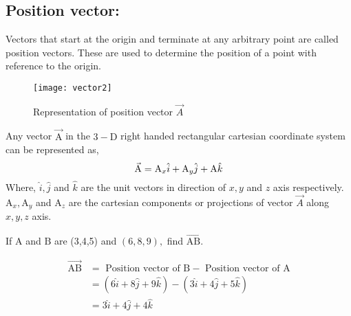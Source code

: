 \subsection{Position vector:} 
\begin{definition}
	Vectors that start at the origin and terminate at any arbitrary point are called position vectors. These are used to determine the position of a point with reference to the origin.
\end{definition}
\begin{figure}[H]
	\centering
	\texttt{[image: vector2]}
	\caption{Representation of position vector $\vec{A }$}
\end{figure}
 Any vector $\vec{\mathrm A}$ in the $3-\mathrm{\mathrm D}$ right handed rectangular cartesian coordinate system can be represented as,
 \begin{equation}
$$\vec{\mathrm A}=\mathrm A_{x} \hat{i}+\mathrm A_{y} \hat{j}+\mathrm A \hat{k}$$
 \end{equation} 
Where, $\hat{i}, \hat{j}$ and $\hat{k}$ are the unit vectors in direction of $x, y$ and $z$ axis respectively. $\mathrm A_{x}, \mathrm A_{y} $ and $ \mathrm A_{z}$ are the
cartesian components or projections of vector $\vec{A}$ along $x, y, z$ axis.
 \begin{exercise}
	 If $\mathrm A$ and $\mathrm B$ are (3,4,5) and $(6,8,9),$ find $\vec {\mathrm {A B}}$.
	\end{exercise}
\begin{answer}
$$\begin{aligned} \overrightarrow{\mathrm {A B}} &=\text { Position vector of } \mathrm B-\text { Position vector of } \mathrm A \\ &=(6 \hat{i}+8 \hat{j}+9 \hat{k})-(3 \hat{i}+4 \hat{j}+5 \hat{k}) \\ &=3 \hat{i}+4 \hat{j}+4 \hat{k} \end{aligned}$$
\end{answer}

